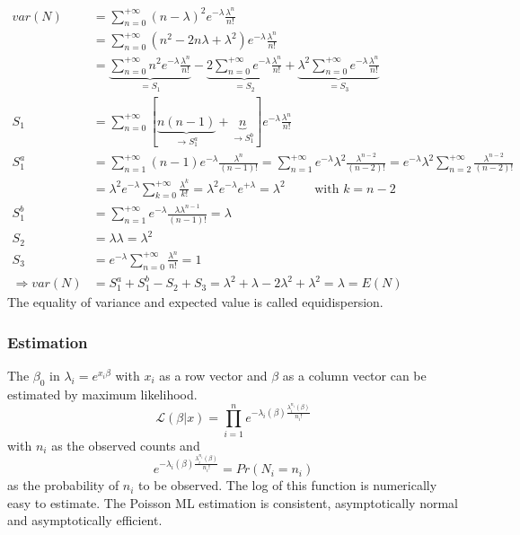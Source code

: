 				\begin{align*}
					var(N)&=\sum\limits_{n=0}^{+\infty} (n-\lambda)^2 e^{-\lambda} \frac{\lambda^n}{n!}\\
					&=\sum\limits_{n=0}^{+\infty} (n^2-2 n \lambda + \lambda^2) e^{-\lambda} \frac{\lambda^n}{n!}\\
					&=\underbrace{\sum\limits_{n=0}^{+\infty} n^2 e^{-\lambda} \frac{\lambda^n}{n!}}_{=S_1} - \underbrace{2 \sum\limits_{n=0}^{+\infty} e^{-\lambda} \frac{\lambda^n}{n!}}_{=S_2}+ \underbrace{\lambda ^2 \sum\limits_{n=0}^{+\infty} e^{-\lambda} \frac{\lambda^n}{n!}}_{=S_3}\\
					S_1&=\sum\limits_{n=0}^{+\infty} \left[\right. \underbrace{n(n-1)}_{\rightarrow S_1^a}+\underbrace{n}_{\rightarrow S_1^b} \left.\right] e^{-\lambda}\frac{\lambda^n}{n!}\\
					S_1^a&=\sum\limits_{n=1}^{+\infty} (n-1) e^{-\lambda} \frac{\lambda^n}{(n-1)!}=\sum\limits_{n=1}^{+\infty} e^{-\lambda} \lambda^2 \frac{\lambda^{n-2}}{(n-2)!}=e^{-\lambda} \lambda^2 \sum\limits_{n=2}^{+\infty} \frac{\lambda^{n-2}}{(n-2)!}\\
					&=\lambda^2 e^{-\lambda} \sum\limits_{k=0}^{+\infty} \frac{\lambda^k}{k!}=\lambda^2 e^{-\lambda} e^{+\lambda}=\lambda^2 \qquad \text{ with }k=n-2\\
					S_1^b&=\sum\limits_{n=1}^{+\infty} e^{-\lambda} \frac{\lambda \lambda^{n-1}}{(n-1)!}=\lambda\\
					S_2&=\lambda\lambda=\lambda^2 \\
					S_3&=e^{-\lambda} \sum\limits_{n=0}^{+\infty} \frac{\lambda^n}{n!}=1\\
					\Rightarrow var(N)&=S_1^a+S_1^b-S_2+S_3=\lambda^2+\lambda-2\lambda^2+\lambda^2=\lambda=E(N)
				\end{align*}
				The equality of variance and expected value is called equidispersion.
			\subsubsection{Estimation}
				The $\beta_0$ in $\lambda_i=e^{x_i\beta}$ with $x_i$ as a row vector and $\beta$ as a column vector can be estimated by maximum likelihood.
				\begin{equation*}
					\mathcal{L}(\beta|x)=\prod_{i=1}^{n} e^{-\lambda_i(\beta) \frac{\lambda_i^{n_i}(\beta)}{n_i!}}
				\end{equation*}
				with $n_i$ as the observed counts and 
				\begin{equation*}
					e^{-\lambda_i(\beta) \frac{\lambda_i^{n_i}(\beta)}{n_i!}}=Pr(N_i=n_i)
				\end{equation*}
				as the probability of $n_i$ to be observed. The log of this function is numerically easy to estimate. The Poisson ML estimation is consistent, asymptotically normal and asymptotically efficient.
